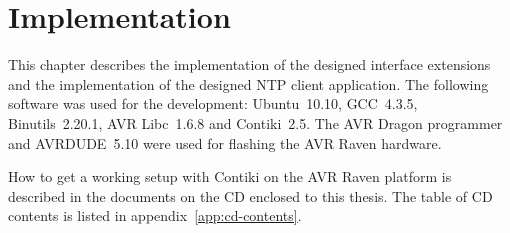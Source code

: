 
\chapter{Implementation}
This chapter describes the implementation of the designed interface extensions
and the implementation of the designed NTP client application.
The following software was used for the development:
Ubuntu~10.10, GCC~4.3.5, Binutils~2.20.1, AVR Libc~1.6.8 and Contiki~2.5.
The AVR Dragon programmer and AVRDUDE~5.10
were used for flashing the AVR Raven hardware.

How to get a working setup with Contiki on the AVR Raven platform is described in
the documents on the CD enclosed to this thesis.
The table of CD contents is listed in appendix~\ref{app:cd-contents}.








